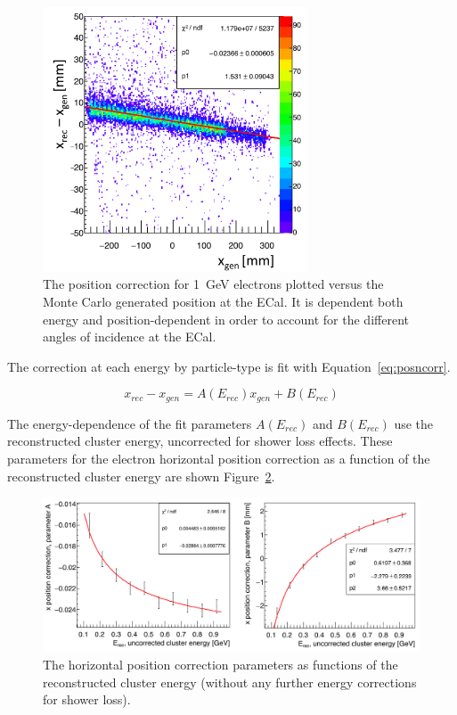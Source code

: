 \begin{figure}[htb]
  \centering
      \includegraphics[width=0.7\textwidth]{pics/performance/xposn1gev.png}
  \caption[Horizontal position correction for 1~GeV electrons]{The position correction for 1~GeV electrons plotted versus the Monte Carlo generated position at the ECal. It is dependent both energy and position-dependent in order to account for the different angles of incidence at the ECal.}
  \label{Figure:xposn1gev}
\end{figure}

The correction at each energy by particle-type is fit with Equation~\eqref{eq:posncorr}. 

\begin{equation}
\label{eq:posncorr}
x_{rec} - x_{gen} = A(E_{rec}) x_{gen} + B(E_{rec})
\end{equation}

The energy-dependence of the fit parameters $A(E_{rec})$ and $B(E_{rec})$ use the reconstructed cluster energy, uncorrected for shower loss effects. These parameters for the electron horizontal position correction as a function of the reconstructed cluster energy are shown Figure~\ref{Figure:xposcorrPar}.

\begin{figure}[htb]
  \centering
      \includegraphics[width=1.0\textwidth]{pics/performance/xposcorrPar.png}
  \caption[Horizontal position correction dependence for electrons]{The horizontal position correction parameters as functions of the reconstructed cluster energy (without any further energy corrections for shower loss).}
  \label{Figure:xposcorrPar}
\end{figure}

